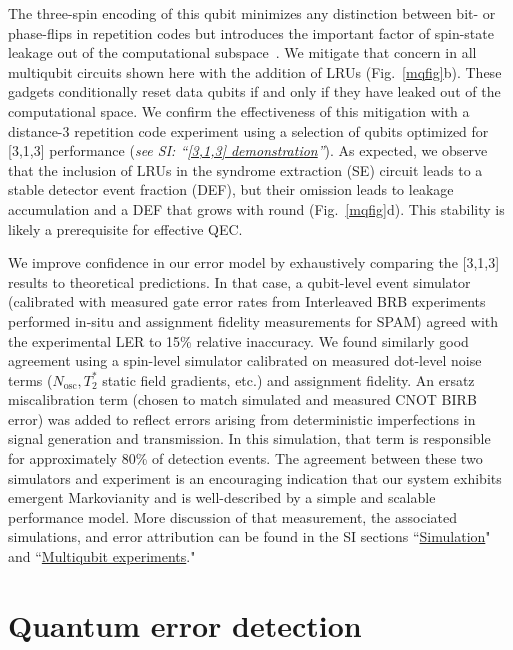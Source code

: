 \documentclass[aps,prl,twocolumn,superscriptaddress,nobibnotes,10pt,floatfix]{revtex4-2}
\newcommand{\figsubref}[2]{Fig.~\ref{#1}{#2}}
\newcommand{\SIlink}[2]{\textit{see SI: ``\hyperref[#2]{#1}''}}
\begin{document}
	The three-spin encoding of this qubit minimizes any distinction between bit- or phase-flips in repetition codes but introduces the important factor of spin-state leakage out of the computational subspace~\cite{
		divincenzo_universal_2000,
		fong_universal_2011,
		andrews_quantifying_2019,
		langrock_reset-if-leaked_2020,
		weinstein_universal_2023}.
	We mitigate that concern in all multiqubit circuits shown here with the addition of LRUs (\figsubref{mqfig}{b}).
	These gadgets conditionally reset data qubits if and only if they have leaked out of the computational space.
	We confirm the effectiveness of this mitigation with a distance-3 repetition code experiment using a selection of qubits optimized for {[}3,1,3{]} performance (\SIlink{[3,1,3] demonstration}{demonstration-313}).
	As expected, we observe that the inclusion of LRUs in the syndrome extraction (SE) circuit leads to a stable detector event fraction (DEF), but their omission leads to leakage accumulation and a DEF that grows with round (\figsubref{mqfig}{d}).
	This stability is likely a prerequisite for effective QEC.

	We improve confidence in our error model by exhaustively comparing the {[}3,1,3{]} results to theoretical predictions.
	In that case, a qubit-level event simulator (calibrated with measured gate error rates from Interleaved BRB experiments performed in-situ and assignment fidelity measurements for SPAM) agreed with the experimental LER to 15\% relative inaccuracy.
	We found similarly good agreement using a spin-level simulator calibrated on measured dot-level noise terms ($N_{\text{osc}}, T_{2}^{*}$ static field gradients, etc.) and assignment fidelity.
	An ersatz miscalibration term (chosen to match simulated and measured CNOT BIRB error) was added to reflect errors arising from deterministic imperfections in signal generation and transmission.
	In this simulation, that term is responsible for approximately 80\% of detection events.
	The agreement between these two simulators and experiment is an encouraging indication that our system exhibits emergent Markovianity and is well-described by a simple and scalable performance model.
	More discussion of that measurement, the associated simulations, and error attribution can be found in the SI sections ``\hyperref[simulation]{Simulation}" and  ``\hyperref[multiqubit-experiments]{Multiqubit experiments}."

	\section{Quantum error detection}\label{quantum-error-detection}
\end{document}
